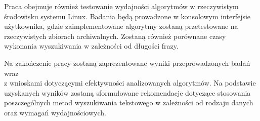 Praca obejmuje również testowanie wydajności algorytmów w rzeczywistym 
środowisku systemu Linux. Badania będą prowadzone w konsolowym interfejsie 
użytkownika, gdzie zaimplementowane algorytmy zostaną przetestowane na 
rzeczywistych zbiorach archiwalnych. Zostaną również porównane czasy wykonania
wyszukiwania w zależności od długości frazy.

Na zakończenie pracy zostaną zaprezentowane wyniki przeprowadzonych badań wraz \\ 
z wnioskami dotyczącymi efektywności analizowanych algorytmów. Na podstawie 
uzyskanych wyników zostaną sformułowane rekomendacje dotyczące stosowania 
poszczególnych metod wyszukiwania tekstowego w zależności od rodzaju danych 
oraz wymagań wydajnościowych.


